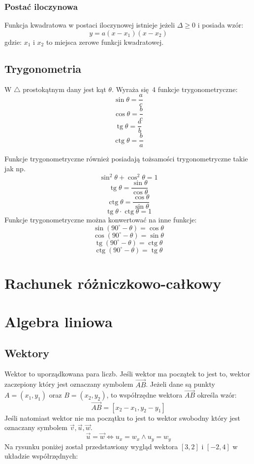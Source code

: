 \documentclass[12pt, a4paper]{article}
\DeclareMathOperator{\tg}{tg}
\DeclareMathOperator{\ctg}{ctg}
\begin{document}
\subsubsection*{Postać iloczynowa}
Funkcja kwadratowa w postaci iloczynowej istnieje jeżeli $\Delta \geq 0$ i posiada wzór:
$$y = a\left(x - x_1\right)\left(x - x_2\right)$$
gdzie: $x_1$ i $x_2$ to miejsca zerowe funkcji kwadratowej.

\subsection{Trygonometria}
W $\triangle$ prostokątnym dany jest kąt $\theta$. Wyraża się 4 funkcje trygonometryczne:
$$\sin\theta=\frac{a}{c}$$
$$\cos\theta=\frac{b}{c}$$
$$\tg\theta=\frac{a}{b}$$
$$\ctg\theta=\frac{b}{a}$$
\begin{center}
\end{center}
Funkcje trygonometryczne również posiadają tożsamości trygonometryczne takie jak np.
$$\sin^2\theta+\cos^2\theta = 1$$
$$\tg\theta=\frac{\sin\theta}{\cos\theta}$$
$$\ctg\theta=\frac{\cos\theta}{\sin\theta}$$
$$\tg\theta\cdot\ctg\theta=1$$
Funkcje trygonometryczne można konwertować na inne funkcje:
$$\sin(90^{\circ}-\theta)=\cos\theta$$
$$\cos(90^{\circ}-\theta)=\sin\theta$$
$$\tg(90^{\circ}-\theta)=\ctg\theta$$
$$\ctg(90^{\circ}-\theta)=\tg\theta$$
\section{Rachunek różniczkowo-całkowy}
\section{Algebra liniowa}
\subsection{Wektory}
Wektor to uporządkowana para liczb. Jeśli wektor ma początek to jest to, wektor
zaczepiony który jest oznaczany symbolem $\overrightarrow{AB}$. Jeżeli dane są punkty
$A = (x_1,y_1)$ oraz $B = (x_2,y_2)$,
to współrzędne wektora $\overrightarrow{AB}$ określa wzór: $$\overrightarrow{AB} = [x_2-x_1,y_2-y_1]$$
Jeśli natomiast wektor nie ma początku to jest to wektor swobodny który
jest oznaczany symbolem $\overrightarrow{v}, \overrightarrow{u}, \overrightarrow{w}$.
$$\overrightarrow{u} = \overrightarrow{w} \Longleftrightarrow u_x = w_x \wedge u_y = w_y$$
Na rysunku poniżej został przedstawiony wygląd wektora $[3,2]$ i $[-2,4]$ w układzie współrzędnych:
\end{document}
